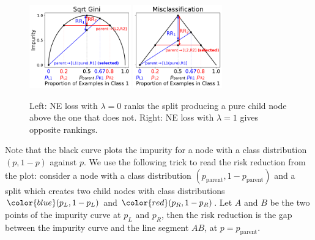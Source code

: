 \documentclass[letterpaper]{article} %
\begin{document}
\begin{figure}[h]
    \centering
    \includegraphics[height=3.6cm]{figs/r2_sqrtgini.pdf}
    \includegraphics[height=3.6cm]{figs/r2_misc.pdf}
    \caption{
    Left: NE loss with $\lambda=0$ ranks the split producing a pure child node above the one that does not.
    Right: NE loss with $\lambda=1$ gives opposite rankings.
    }
    \label{fig:alternate_early_stopping}
\end{figure}

Note that the black curve plots the impurity for a node with a class distribution $(p, 1-p)$ against $p$.
We use the following trick to read the risk reduction from the plot:
consider a node with a class distribution $(p_{\text{parent}}, 1-p_{\text{parent}})$ and
a split which creates two child nodes with class distributions ${\color{blue}(p_{L}, 1-p_{L})}$ and
${\color{red}(p_{R}, 1-p_{R})}$.
Let $A$ and $B$ be the two points of the impurity curve at $p_{L}$ and $p_{R}$, then
the risk reduction is the gap between the impurity curve and the line segment $AB$, at $p=p_{\text{parent}}$.
\end{document}
